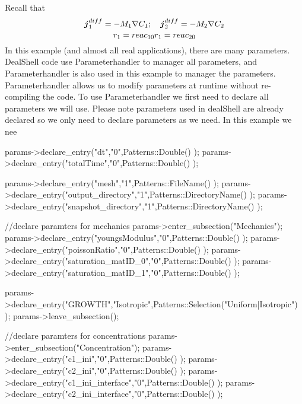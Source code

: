 Recall that \[ \boldsymbol{j}_1^{diff}=-M_1\nabla C_\text{1}; \quad \boldsymbol{j}_2^{diff}=-M_2\nabla C_\text{2}\\ \] \[ r_1= reac_{10} \\ r_1= reac_{20} \] In this example (and almost all real applications), there are many parameters. Deal\-Shell code use {\ttfamily Parameterhandler} to manager all parameters, and {\ttfamily Parameterhandler} is also used in this example to manager the parameters. {\ttfamily Parameterhandler} allows us to modify parameters at runtime without re-\/compiling the code. To use {\ttfamily Parameterhandler} we first need to declare all parameters we will use. Please note parameters used in deal\-Shell are already declared so we only need to declare parameters as we need. In this example we nee 
\begin{DoxyCode}
    params->declare\_entry(\textcolor{stringliteral}{"dt"},\textcolor{stringliteral}{"0"},Patterns::Double() );
    params->declare\_entry(\textcolor{stringliteral}{"totalTime"},\textcolor{stringliteral}{"0"},Patterns::Double() );
    
    params->declare\_entry(\textcolor{stringliteral}{"mesh"},\textcolor{stringliteral}{"1"},Patterns::FileName() );
    params->declare\_entry(\textcolor{stringliteral}{"output\_directory"},\textcolor{stringliteral}{"1"},Patterns::DirectoryName() );
    params->declare\_entry(\textcolor{stringliteral}{"snapshot\_directory"},\textcolor{stringliteral}{"1"},Patterns::DirectoryName() );
    
    \textcolor{comment}{//declare paramters for mechanics}
    params->enter\_subsection(\textcolor{stringliteral}{"Mechanics"});
    params->declare\_entry(\textcolor{stringliteral}{"youngsModulus"},\textcolor{stringliteral}{"0"},Patterns::Double() );
    params->declare\_entry(\textcolor{stringliteral}{"poissonRatio"},\textcolor{stringliteral}{"0"},Patterns::Double() );
    params->declare\_entry(\textcolor{stringliteral}{"saturation\_matID\_0"},\textcolor{stringliteral}{"0"},Patterns::Double() );
    params->declare\_entry(\textcolor{stringliteral}{"saturation\_matID\_1"},\textcolor{stringliteral}{"0"},Patterns::Double() );
    
    params->declare\_entry(\textcolor{stringliteral}{"GROWTH"},\textcolor{stringliteral}{"Isotropic"},Patterns::Selection(\textcolor{stringliteral}{"Uniform|Isotropic"}) );
    params->leave\_subsection(); 
    
    \textcolor{comment}{//declare paramters for concentrations}
    params->enter\_subsection(\textcolor{stringliteral}{"Concentration"});
    params->declare\_entry(\textcolor{stringliteral}{"c1\_ini"},\textcolor{stringliteral}{"0"},Patterns::Double() );
    params->declare\_entry(\textcolor{stringliteral}{"c2\_ini"},\textcolor{stringliteral}{"0"},Patterns::Double() );
    params->declare\_entry(\textcolor{stringliteral}{"c1\_ini\_interface"},\textcolor{stringliteral}{"0"},Patterns::Double() );
    params->declare\_entry(\textcolor{stringliteral}{"c2\_ini\_interface"},\textcolor{stringliteral}{"0"},Patterns::Double() );
    

\end{DoxyCode}
